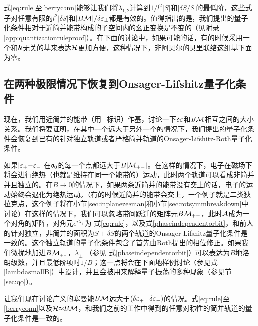 式\ref{eq:rule}至\ref{berryconn}能够让我们将$\lambda_{1,2}$计算到$1/l^2|S|$和$|\delta S/S|$的最低阶，这些式子对任意有限的$l^2|\delta S|$和$|B{\cal M}|/\delta \varepsilon_{\pm}$都是有效的。值得指出的是，我们提出的量子化条件相对于近简并能带构成的子空间内的幺正变换是不变的（见附录\ref{app:quantizationruleproof}）。在下面的讨论中，如果可能的话，有的时候采用一个和$\boldsymbol{k}$无关的基来表达${\cal H}$更加方便，这种情况下，非阿贝尔的贝里联络这组基下面为零。

\subsection{在两种极限情况下恢复到Onsager-Lifshitz量子化条件}\label{sec:recoveronsager}

现在，我们用近简并的能带（用$\pm$标识）作基，讨论一下$\delta \varepsilon$和$B{\cal M}$相互之间的大小关系。我们将要证明，在其中一个远大于另外一个的情况下，我们提出的量子化条件会恢复到已有的针对独立轨道或者严格简并轨道的Onsager-Lifshitz-Roth量子化条件。

 如果$|\varepsilon_+{-}\varepsilon_-|$在$\mathfrak{o}_0$的每一个点都远大于$B|{\cal M}_{+-}|$。在这样的情况下，电子在磁场下将会进行绝热（也就是维持在同一个能带的）运动\cite{nenciu_review}，此时两个轨道可以看成非简并并且独立的。在$B{\rightarrow} 0$的情况下，如果两条近简并的能带没有交上的话，电子的运动始终会退化为绝热运动。（有的时候近简并的能带会交上，一个例子就是二类狄拉克点，这个例子将在小节\ref{sec:inplanezeeman}和小节\ref{sec:rotsymmbreakdown}中讨论）在这样的情况下，我们可以忽略带间跃迁的矩阵元$B{\cal M}_{+-}$，此时${\cal A}$成为一个对角的矩阵，对角元$e^{i\lambda_{\pm}}$为
式\ref{eq:rule}，以及式\ref{phaseindependentorbit}，和前人的针对独立，非简并的面积为$S{\pm}\delta S$的两个轨道的Onsager-Lifshitz量子化条件是一致的\cite{Onsager,lifshitz_kosevich,lifshitz_kosevich_jetp}。这个独立轨道的量子化条件包含了首先由Roth\cite{rothmag}提出的相位修正。如果我们微扰地加进$B{\cal M}_{\scriptscriptstyle{+-}}$，$\lambda_{\pm}$ （参见 式\ref{phaseindependentorbit}）可以表达为$B$地洛朗级数，并且最低阶项时$1/B$；这一点将会在下面地样例讨论（参见式 \ref{lambdasmallB}）中设计，并且会被用来解释量子振荡的多种现象（参见节\ref{sec:qo}）。


 让我们现在讨论广义的塞曼能$B{\cal M}$远大于$(\delta \varepsilon_+{-}\delta\varepsilon_-)$的情况。式\ref{eq:rule}至\ref{berryconn}以及${\cal H}{\approx}B{\cal M}$，和我们之前的工作中\cite{topoferm,100p}得到的任意对称性的简并轨道的量子化条件是一致的。


